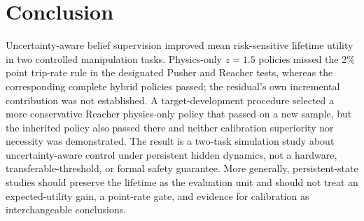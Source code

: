 \section{Conclusion}
\label{sec:conclusion}

Uncertainty-aware belief supervision improved mean risk-sensitive lifetime
utility in two controlled manipulation tasks. Physics-only $z=1.5$ policies
missed the 2\% point trip-rate rule in the designated Pusher and Reacher tests,
whereas the corresponding complete hybrid policies passed; the residual's own
incremental contribution was not established. A target-development procedure
selected a more conservative Reacher physics-only policy that passed on a new
sample, but the inherited policy also passed there and neither calibration
superiority nor necessity was demonstrated. The result is a two-task
simulation study about uncertainty-aware control under persistent hidden
dynamics, not a hardware, transferable-threshold, or formal safety guarantee.
More generally, persistent-state studies should preserve the lifetime as the
evaluation unit and should not treat an expected-utility gain, a point-rate
gate, and evidence for calibration as interchangeable conclusions.
